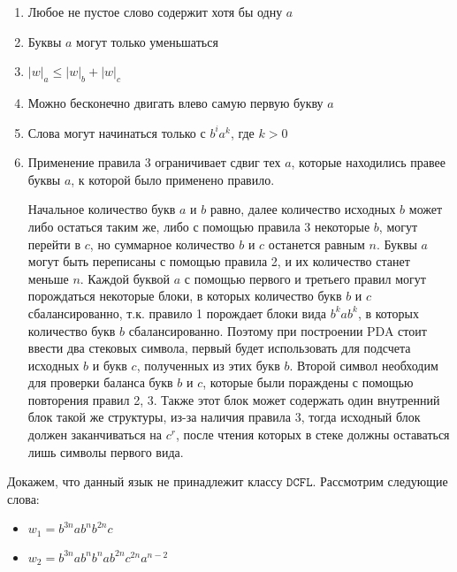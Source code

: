 \documentclass[a4paper, 14pt]{article}
\begin{document}
\begin{enumerate}
  \item Любое не пустое слово содержит хотя бы одну $a$
  \item Буквы $a$ могут только уменьшаться
  \item $|w|_a \leq |w|_b + |w|_c$
  \item Можно бесконечно двигать влево самую первую букву $a$
  \item Слова могут начинаться только с $b^i a^k$, где $k > 0$
  \item Применение правила 3 ограничивает сдвиг тех $a$, которые находились правее буквы $a$, к которой было применено правило.

    
Начальное количество букв $a$ и $b$ равно, далее количество исходных $b$ может либо остаться таким же, либо с помощью правила 3 некоторые $b$, могут перейти в $c$, но суммарное количество $b$ и $c$ останется равным $n$. Буквы $a$ могут быть переписаны с помощью правила 2, и их количество станет меньше $n$. Каждой буквой $a$ с помощью первого и третьего правил могут порождаться некоторые блоки, в которых количество букв $b$ и $c$ сбалансированно, т.к. правило 1 порождает блоки вида $b^k a b^k$, в которых количество букв $b$ сбалансированно. Поэтому при построении PDA стоит ввести два стековых символа, первый будет использовать для подсчета исходных $b$ и букв $c$, полученных из этих букв $b$. Второй символ необходим для проверки баланса букв $b$ и $c$, которые были пораждены с помощью повторения правил 2, 3. Также этот блок может содержать один внутренний блок такой же структуры, из-за наличия правила 3, тогда исходный блок должен заканчиваться на $c^r$, после чтения которых в стеке должны оставаться лишь символы первого вида.







\end{enumerate}


Докажем, что данный язык не принадлежит классу $\mathtt{DCFL}$. Рассмотрим следующие слова:

%
\begin{itemize}
  \item $w_1 = b^{3n} a b^n b^{2n} c$
  \item $w_2 = b^{3n} a b^{n} b^{n} a b^{2n} c^{2n} a^{n-2}$
\end{itemize}
\end{document}
